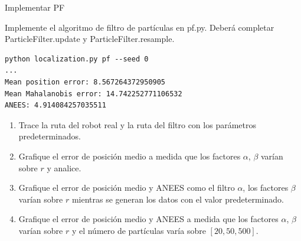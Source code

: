 \documentclass[tp]{lcc}
\begin{document}
	\ejercicio Implementar PF
	
	Implemente el algoritmo de filtro de partículas en pf.py. Deberá completar ParticleFilter.update y ParticleFilter.resample.

\begin{lstlisting}[style=bash] 
python localization.py pf --seed 0
...
Mean position error: 8.567264372950905
Mean Mahalanobis error: 14.742252771106532
ANEES: 4.914084257035511
\end{lstlisting}

	\begin{enumerate}
		\item Trace la ruta del robot real y la ruta del filtro con los parámetros predeterminados.
		\item Grafique el error de posición medio a medida que los factores $\alpha$, $\beta$ varían sobre $r$ y analice.
		\item Grafique el error de posición medio y ANEES como el filtro $\alpha$, los factores $\beta$ varían sobre $r$ mientras se generan los datos
		con el valor predeterminado.
		\item Grafique el error de posición medio y ANEES a medida que los factores $\alpha$, $\beta$ varían sobre $r$ y el número de partículas varía
		sobre $[20, 50, 500]$.
	\end{enumerate}


	\printbibliography
	
\end{document}
